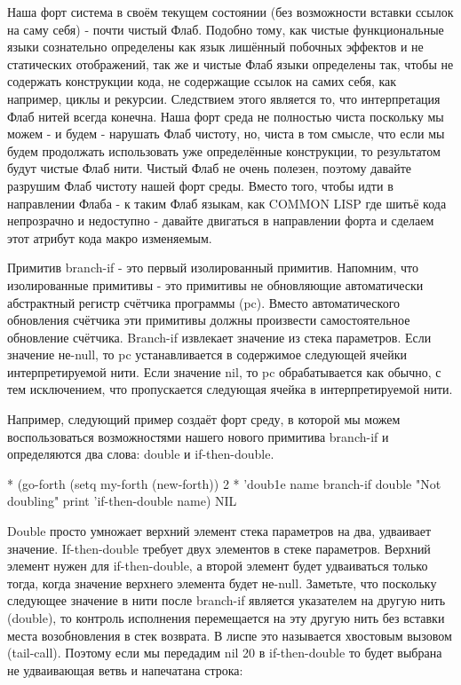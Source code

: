 {{{Наша форт система в своём текущем состоянии (без возможности вставки ссылок на саму себя) - почти чистый Флаб. Подобно тому, как чистые функциональные языки сознательно определены как язык лишённый побочных эффектов и не статических отображений, так же и чистые Флаб языки определены так, чтобы не содержать конструкции кода, не содержащие ссылок на самих себя, как например, циклы и рекурсии. Следствием этого является то, что интерпретация Флаб нитей всегда конечна. Наша форт среда не полностью чиста поскольку мы можем - и будем - нарушать Флаб чистоту, но, чиста в том смысле, что если мы будем продолжать использовать уже определённые конструкции, то результатом будут чистые Флаб нити. Чистый Флаб не очень полезен, поэтому давайте разрушим Флаб чистоту нашей форт среды. Вместо того, чтобы идти в направлении Флаба - к таким Флаб языкам, как COMMON LISP где шитьё кода непрозрачно и недоступно - давайте двигаться в направлении форта и сделаем этот атрибут кода макро изменяемым.

Примитив branch-if - это первый изолированный примитив. Напомним, что изолированные примитивы - это примитивы не обновляющие автоматически абстрактный регистр счётчика программы (pc). Вместо автоматического обновления счётчика эти примитивы должны произвести самостоятельное обновление счётчика. Branch-if извлекает значение из стека параметров. Если значение не-null, то pc устанавливается в содержимое следующей ячейки интерпретируемой нити. Если значение nil, то pc обрабатывается как обычно, с тем исключением, что пропускается следующая ячейка в интерпретируемой нити.

Например, следующий пример создаёт форт среду, в которой мы можем воспользоваться возможностями нашего нового примитива branch-if и определяются два слова: double и if-then-double.

* (go-forth (setq my-forth (new-forth))
{ 2 * } ’doub1e name
{ branch-if double "Not doubling" print }
’if-then-double name)
NIL

Double просто умножает верхний элемент стека параметров на два, удваивает значение. If-then-double требует двух элементов в стеке параметров. Верхний элемент нужен для if-then-double, а второй элемент будет удваиваться только тогда, когда значение верхнего элемента будет не-null. Заметьте, что поскольку следующее значение в нити после branch-if является указателем на другую нить (double), то контроль исполнения перемещается на эту другую нить без вставки места возобновления в стек возврата. В лиспе это называется хвостовым вызовом (tail-call). Поэтому если мы передадим nil 20 в if-then-double то будет выбрана не удваивающая ветвь и напечатана строка:

}}}
